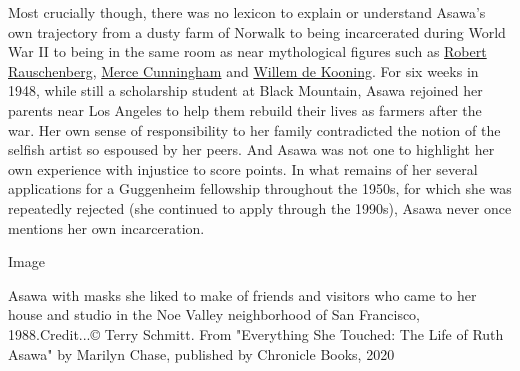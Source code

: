 Most crucially though, there was no lexicon to explain or understand
Asawa's own trajectory from a dusty farm of Norwalk to being
incarcerated during World War II to being in the same room as near
mythological figures such as
\href{https://www.nytimes3xbfgragh.onion/2015/06/03/t-magazine/robert-rauschenberg-endless-combinations.html}{Robert
Rauschenberg},
\href{https://www.nytimes3xbfgragh.onion/2017/02/07/t-magazine/art/merce-cunningham-exhibit-walker-art-center.html}{Merce
Cunningham} and
\href{https://www.nytimes3xbfgragh.onion/2016/11/15/t-magazine/art/willem-de-kooning-zao-wou-ki-two-men-show.html}{Willem
de Kooning}. For six weeks in 1948, while still a scholarship student at
Black Mountain, Asawa rejoined her parents near Los Angeles to help them
rebuild their lives as farmers after the war. Her own sense of
responsibility to her family contradicted the notion of the selfish
artist so espoused by her peers. And Asawa was not one to highlight her
own experience with injustice to score points. In what remains of her
several applications for a Guggenheim fellowship throughout the 1950s,
for which she was repeatedly rejected (she continued to apply through
the 1990s), Asawa never once mentions her own incarceration.

Image

Asawa with masks she liked to make of friends and visitors who came to
her house and studio in the Noe Valley neighborhood of San Francisco,
1988.Credit...© Terry Schmitt. From "Everything She Touched: The Life of
Ruth Asawa" by Marilyn Chase, published by Chronicle Books, 2020


